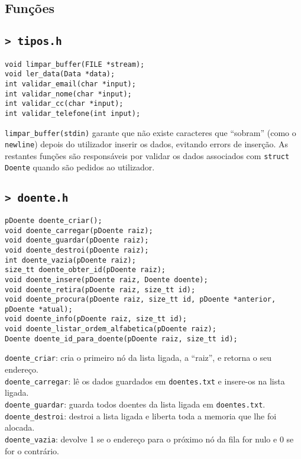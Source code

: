 \documentclass[a4paper, 12pt]{article}
\newcommand\code[1]{\texttt{\sloppy #1}}
\begin{document}
\subsection{Funções}

\subsection*{\code{> tipos.h}}
\begin{verbatim}
void limpar_buffer(FILE *stream);
void ler_data(Data *data);
int validar_email(char *input);
int validar_nome(char *input);
int validar_cc(char *input);
int validar_telefone(int input);
\end{verbatim}

\code{limpar\_buffer(stdin)} garante que não existe caracteres que ``sobram'' (como o \code{newline}) depois do utilizador inserir os dados, evitando errors de inserção. As restantes funções são responsáveis por validar os dados associados com \code{struct Doente} quando são pedidos ao utilizador.

\subsection*{\code{> doente.h}}

\begin{verbatim}
pDoente doente_criar();
void doente_carregar(pDoente raiz);
void doente_guardar(pDoente raiz);
void doente_destroi(pDoente raiz);
int doente_vazia(pDoente raiz);
size_tt doente_obter_id(pDoente raiz);
void doente_insere(pDoente raiz, Doente doente);
void doente_retira(pDoente raiz, size_tt id);
void doente_procura(pDoente raiz, size_tt id, pDoente *anterior, pDoente *atual);
void doente_info(pDoente raiz, size_tt id);
void doente_listar_ordem_alfabetica(pDoente raiz); 
Doente doente_id_para_doente(pDoente raiz, size_tt id);
\end{verbatim}

\code{doente\_criar}: cria o primeiro nó da lista ligada, a ``raiz'', e retorna o seu endereço.\\
\code{doente\_carregar}: lê os dados guardados em \code{doentes.txt} e insere-os na lista ligada.\\
\code{doente\_guardar}: guarda todos doentes da lista ligada em \code{doentes.txt}.
\code{doente\_destroi}: destroi a lista ligada e liberta toda a memoria que lhe foi alocada.\\
\code{doente\_vazia}: devolve 1 se o endereço para o próximo nó da fila for nulo e 0 se for o contrário. 
\end{document}
